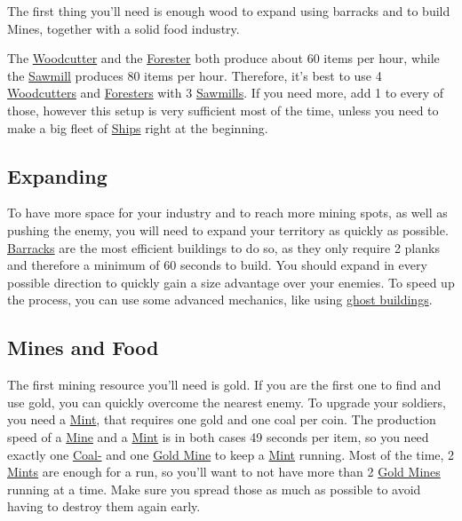 \documentclass[12pt]{article}
\begin{document}
The first thing you'll need is enough wood to expand using barracks and to build Mines, together with a solid food industry.

The \hyperref[sec:woodcutter]{Woodcutter} and the \hyperref[sec:forester]{Forester} both produce about 60 items per hour, while the \hyperref[sec:sawmill]{Sawmill} produces 80 items per hour. Therefore, it's best to use 4 \hyperref[sec:woodcutter]{Woodcutters} and \hyperref[sec:forester]{Foresters} with 3 \hyperref[sec:sawmill]{Sawmills}. If you need more, add 1 to every of those, however this setup is very sufficient most of the time, unless you need to make a big fleet of \hyperref[sec:ship]{Ships} right at the beginning.

\subsection{Expanding}
\label{sec:expanding}

To have more space for your industry and to reach more mining spots, as well as pushing the enemy, you will need to expand your territory as quickly as possible. \hyperref[sec:barrack]{Barracks} are the most efficient buildings to do so, as they only require 2 planks and therefore a minimum of 60 seconds to build. You should expand in every possible direction to quickly gain a size advantage over your enemies. To speed up the process, you can use some advanced mechanics, like using \hyperref[sec:ghostbuildings]{ghost buildings}.

\subsection{Mines and Food}
\label{sec:minesandfoot}

The first mining resource you'll need is gold. If you are the first one to find and use gold, you can quickly overcome the nearest enemy. To upgrade your soldiers, you need a \hyperref[sec:mint]{Mint}, that requires one gold and one coal per coin. The production speed of a \hyperref[sec:mine]{Mine} and a \hyperref[sec:mint]{Mint} is in both cases 49 seconds per item, so you need exactly one \hyperref[sec:coalmine]{Coal-} and one \hyperref[sec:goldmine]{Gold Mine} to keep a \hyperref[sec:mint]{Mint} running. Most of the time, 2 \hyperref[sec:mint]{Mints} are enough for a run, so you'll want to not have more than 2 \hyperref[sec:goldmine]{Gold Mines} running at a time. Make sure you spread those as much as possible to avoid having to destroy them again early.
\end{document}
